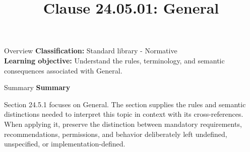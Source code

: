 \documentclass[10pt,letterpaper]{article}
\title{Clause 24.05.01: General}
\author{}
\date{}
\begin{document}
\maketitle
\begin{CornellOverviewBox}{Overview}
\textbf{Classification:} Standard library - Normative\\[2pt]
\textbf{Learning objective:} Understand the rules, terminology, and semantic consequences associated with General.
\end{CornellOverviewBox}\begin{CornellSummaryBox}{Summary}
{\sffamily\bfseries\color{Accent} Summary}\par\vspace{3pt}Section 24.5.1 focuses on General. The section supplies the rules and semantic distinctions needed to interpret this topic in context with its cross-references. When applying it, preserve the distinction between mandatory requirements, recommendations, permissions, and behavior deliberately left undefined, unspecified, or implementation-defined.
\end{CornellSummaryBox}
\end{document}
